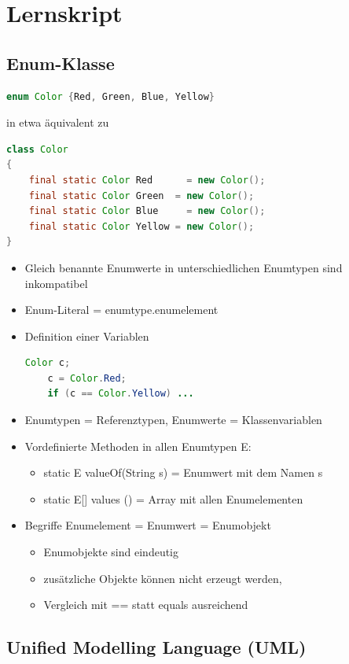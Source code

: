 \chapter{Lernskript}
\section{Enum-Klasse}
 \begin{lstlisting}[language=JAVA]
enum Color {Red, Green, Blue, Yellow}
\end{lstlisting}
in etwa äquivalent zu
\begin{lstlisting}[language=JAVA]
class Color
{
	final static Color Red      = new Color();
	final static Color Green  = new Color();
	final static Color Blue     = new Color();
	final static Color Yellow = new Color();
}
\end{lstlisting}
\begin{itemize}
        \item Gleich benannte Enumwerte in unterschiedlichen Enumtypen sind inkompatibel
	\item Enum-Literal = enumtype.enumelement
	\item Definition  einer Variablen
 \begin{lstlisting}[language=JAVA]
       Color c;
	c = Color.Red;
	if (c == Color.Yellow) ...
	\end{lstlisting}
	\item Enumtypen = Referenztypen, Enumwerte = Klassenvariablen
	\item Vordefinierte Methoden in allen Enumtypen E:
	\begin{itemize}
		\item static E valueOf(String s) = Enumwert mit dem Namen s
		\item static E[] values () = Array mit allen Enumelementen
	\end{itemize}
	\item Begriffe Enumelement = Enumwert = Enumobjekt
	\begin{itemize}
	\item Enumobjekte sind eindeutig
	\item zusätzliche Objekte können nicht erzeugt werden, 
	\item Vergleich mit == statt equals ausreichend
	\end{itemize}
\end{itemize}
%
%
%
\section{Unified Modelling Language (UML)}
